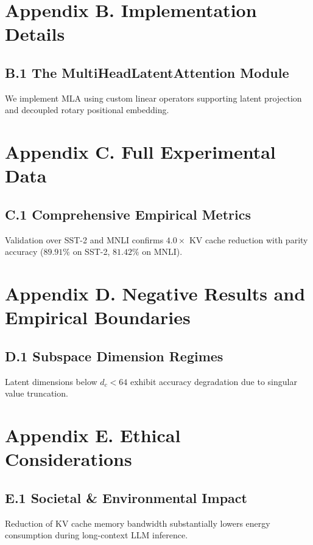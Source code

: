 \section{Appendix B. Implementation Details}
\subsection{B.1 The MultiHeadLatentAttention Module}
We implement MLA using custom linear operators supporting latent projection and decoupled rotary positional embedding.


\section{Appendix C. Full Experimental Data}
\subsection{C.1 Comprehensive Empirical Metrics}
Validation over SST-2 and MNLI confirms $4.0\times$ KV cache reduction with parity accuracy ($89.91\%$ on SST-2, $81.42\%$ on MNLI).


\section{Appendix D. Negative Results and Empirical Boundaries}
\subsection{D.1 Subspace Dimension Regimes}
Latent dimensions below $d_c < 64$ exhibit accuracy degradation due to singular value truncation.


\section{Appendix E. Ethical Considerations}
\subsection{E.1 Societal & Environmental Impact}
Reduction of KV cache memory bandwidth substantially lowers energy consumption during long-context LLM inference.


